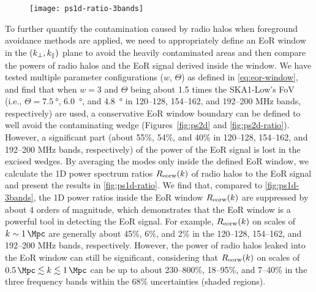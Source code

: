 \begin{figure}[htp]
  \centering
  \texttt{[image: ps1d-ratio-3bands]}
  \label{fig:ps1d-ratio}
\end{figure}

To further quantify the contamination caused by radio halos when
foreground avoidance methods are applied, we need to appropriately
define an EoR window in the $(k_{\perp}, k_{\parallel})$ plane to avoid the
heavily contaminated areas and then compare the powers of radio halos
and the EoR signal derived inside the window.
We have tested multiple parameter configurations ($w$, $\Theta$) as
defined in \autoref{eq:eor-window}, and find that when $w = 3$ and
$\Theta$ being about 1.5 times the SKA1-Low's FoV (i.e.,
$\Theta = \SI{7.5}{\degree}$, \SI{6.0}{\degree}, and \SI{4.8}{\degree}
in \numrange{120}{128}, \numrange{154}{162}, and \numrange{192}{200}
\si{\MHz} bands, respectively) are used, a conservative EoR window
boundary can be defined to well avoid the contaminating wedge
(Figures~\ref{fig:ps2d} and \ref{fig:ps2d-ratio}).
However, a significant part (about 55\%, 54\%, and 40\% in
\numrange{120}{128}, \numrange{154}{162},
and \numrange{192}{200} \si{\MHz} bands, respectively) of the power of
the EoR signal is lost in the excised wedges.
By averaging the modes only inside the defined EoR window, we calculate
the 1D power spectrum ratios $R_{\mathrm{eorw}}(k)$ of radio halos to the EoR
signal and present the results in \autoref{fig:ps1d-ratio}.
We find that, compared to \autoref{fig:ps1d-3bands}, the 1D power ratios
inside the EoR window $R_{\mathrm{eorw}}(k)$ are suppressed by about 4 orders
of magnitude, which demonstrates that the EoR window is a powerful tool
in detecting the EoR signal.
For example, $R_{\mathrm{eorw}}(k)$ on scales of $k \sim \SI{1}{\per\Mpc}$ are
generally about 45\%, 6\%, and 2\% in the \numrange{120}{128},
\numrange{154}{162}, and \numrange{192}{200} \si{\MHz} bands, respectively.
However, the power of radio halos leaked into the EoR window can still be
significant, considering that $R_{\mathrm{eorw}}(k)$ on scales of
$\SI{0.5}{\per\Mpc} \lesssim k \lesssim \SI{1}{\per\Mpc}$ can be up to
about \numrange{230}{800}\%, \numrange{18}{95}\%, and
\numrange{7}{40}\% in the three frequency bands within the
68\% uncertainties (shaded regions).

